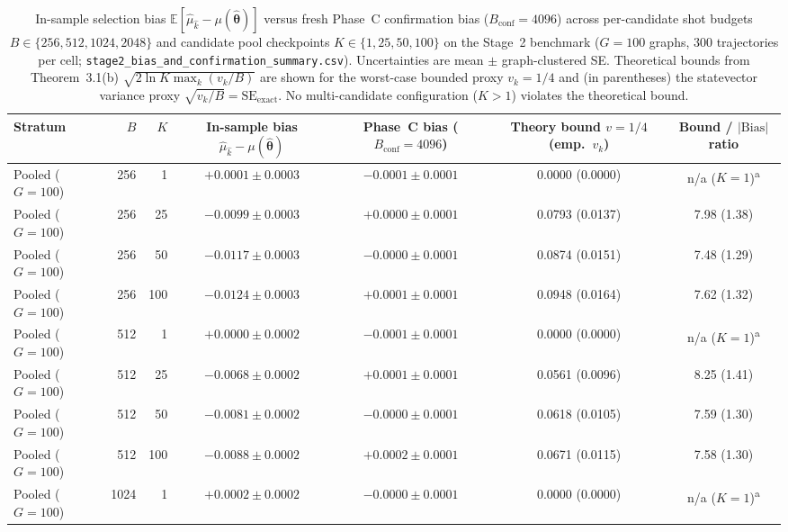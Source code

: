 \begin{table}[htbp]
\caption{In-sample selection bias $\mathbb{E}[\hat{\mu}_{\hat{k}} - \mu(\hat{\bm{\theta}})]$ versus fresh Phase~C confirmation bias ($B_{\mathrm{conf}}=4096$) across per-candidate shot budgets $B \in \{256, 512, 1024, 2048\}$ and candidate pool checkpoints $K \in \{1, 25, 50, 100\}$ on the Stage~2 benchmark ($G=100$ graphs, $300$ trajectories per cell; \texttt{stage2\_bias\_and\_confirmation\_summary.csv}). Uncertainties are mean $\pm$ graph-clustered SE. Theoretical bounds from Theorem~3.1(b) $\sqrt{2\ln K \max_k(v_k/B)}$ are shown for the worst-case bounded proxy $v_k=1/4$ and (in parentheses) the statevector variance proxy $\sqrt{v_k/B} = \mathrm{SE}_{\mathrm{exact}}$. No multi-candidate configuration ($K > 1$) violates the theoretical bound.}
\label{tab:selection_bias}
\centering
\footnotesize
\begin{tabular}{@{}l r r c c c c@{}}
\toprule
Stratum & $B$ & $K$ & In-sample bias $\hat{\mu}_{\hat{k}} - \mu(\hat{\bm{\theta}})$ & Phase~C bias ($B_{\mathrm{conf}}=4096$) & Theory bound $v=1/4$ (emp.\ $v_k$) & Bound / $|\mathrm{Bias}|$ ratio \\
\midrule
Pooled ($G=100$) & 256 & 1 & $+0.0001 \pm 0.0003$ & $-0.0001 \pm 0.0001$ & 0.0000 (0.0000) & n/a ($K=1$)\textsuperscript{a} \\
Pooled ($G=100$) & 256 & 25 & $-0.0099 \pm 0.0003$ & $+0.0000 \pm 0.0001$ & 0.0793 (0.0137) & 7.98 (1.38) \\
Pooled ($G=100$) & 256 & 50 & $-0.0117 \pm 0.0003$ & $-0.0000 \pm 0.0001$ & 0.0874 (0.0151) & 7.48 (1.29) \\
Pooled ($G=100$) & 256 & 100 & $-0.0124 \pm 0.0003$ & $+0.0001 \pm 0.0001$ & 0.0948 (0.0164) & 7.62 (1.32) \\
Pooled ($G=100$) & 512 & 1 & $+0.0000 \pm 0.0002$ & $-0.0001 \pm 0.0001$ & 0.0000 (0.0000) & n/a ($K=1$)\textsuperscript{a} \\
Pooled ($G=100$) & 512 & 25 & $-0.0068 \pm 0.0002$ & $+0.0001 \pm 0.0001$ & 0.0561 (0.0096) & 8.25 (1.41) \\
Pooled ($G=100$) & 512 & 50 & $-0.0081 \pm 0.0002$ & $-0.0000 \pm 0.0001$ & 0.0618 (0.0105) & 7.59 (1.30) \\
Pooled ($G=100$) & 512 & 100 & $-0.0088 \pm 0.0002$ & $+0.0002 \pm 0.0001$ & 0.0671 (0.0115) & 7.58 (1.30) \\
Pooled ($G=100$) & 1024 & 1 & $+0.0002 \pm 0.0002$ & $-0.0000 \pm 0.0001$ & 0.0000 (0.0000) & n/a ($K=1$)\textsuperscript{a} \\

\end{tabular}
\end{table}
